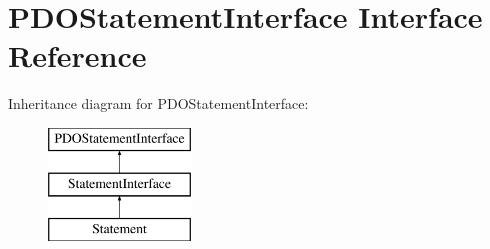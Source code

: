 \hypertarget{interface_pes_1_1_database_1_1_statement_1_1_p_d_o_statement_interface}{}\section{P\+D\+O\+Statement\+Interface Interface Reference}
\label{interface_pes_1_1_database_1_1_statement_1_1_p_d_o_statement_interface}
Inheritance diagram for P\+D\+O\+Statement\+Interface\+:\begin{figure}[H]
\begin{center}
\leavevmode
\includegraphics[height=3.000000cm]{interface_pes_1_1_database_1_1_statement_1_1_p_d_o_statement_interface}
\end{center}
\end{figure}
